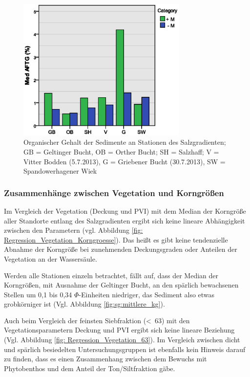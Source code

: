 \begin{figure}[htb]
\centering
\includegraphics[width=0.75\textwidth]{images/salzsedimentauswertung/bar_aftg.eps}
\caption[Organischer Gehalt der Sedimente an Stationen des Salzgradienten]{Organischer Gehalt der Sedimente  an Stationen des Salzgradienten; GB = Geltinger Bucht, OB = Orther Bucht; SH = Salzhaff; V = Vitter Bodden (5.7.2013), G = Griebener Bucht (30.7.2013), SW = Spandowerhagener Wiek}
\label{fig:sg:afdg}
\end{figure}
\FloatBarrier

\subsubsection{Zusammenhänge zwischen Vegetation und Korngrößen}

Im Vergleich der Vegetation (Deckung und PVI) mit dem Median der Korngröße aller Standorte entlang des Salzgradienten ergibt sich keine lineare Abhängigkeit zwischen den Parametern (vgl. Abbildung \ref{fig: Regression_Vegetation_Korngroesse}). Das heißt es gibt keine tendenzielle Abnahme der Korngröße bei zunehmenden Deckungsgraden oder Anteilen der Vegetation an der Wassersäule. 

Werden alle Stationen einzeln betrachtet, fällt auf, dass der Median der Korngrößen, mit Ausnahme der Geltinger Bucht, an den spärlich bewachsenen Stellen um 0,1 bis 0,34 $ \Phi$-Einheiten niedriger, das Sediment also etwas grobkörniger ist (Vgl. Abbildung \ref{fig:sg:mittlere_kg}).

Auch beim Vergleich der feinsten Siebfraktion (\unit{<63}{\mu\metre}) mit den Vegetationsparametern Deckung und PVI ergibt sich keine lineare Beziehung (Vgl. Abbildung \ref{fig: Regression_Vegetation_63}). Im Vergleich zwischen dicht und spärlich besiedelten Untersuchungsgruppen ist ebenfalls kein Hinweis darauf zu finden, dass  es einen Zusammenhang zwischen dem Bewuchs mit Phytobenthos und dem Anteil der Ton/Siltfraktion gäbe. 



